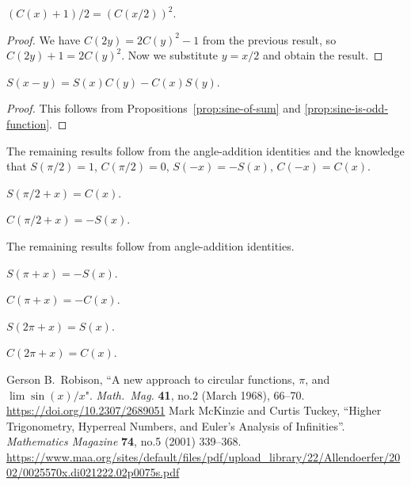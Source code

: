 \begin{proposition}
$(C(x) + 1)/2 = (C(x/2))^{2}$.
\end{proposition}

\begin{proof}
  We have $C(2y) = 2C(y)^{2} - 1$ from the previous result, so
  $C(2y) + 1 = 2C(y)^{2}$. Now we substitute $y=x/2$ and obtain the result.
\end{proof}

\begin{proposition}
$S(x-y) = S(x)C(y) - C(x)S(y)$.
\end{proposition}

\begin{proof}
This follows from Propositions~\ref{prop:sine-of-sum} and \ref{prop:sine-is-odd-function}.
\end{proof}

The remaining results follow from the angle-addition identities and the
knowledge that $S(\pi/2)=1$, $C(\pi/2)=0$, $S(-x)=-S(x)$, $C(-x)=C(x)$.

\begin{proposition}
$S(\pi/2 + x) = C(x)$.
\end{proposition}

\begin{proposition}
$C(\pi/2 + x) = -S(x)$.
\end{proposition}

The remaining results follow from angle-addition identities.

\begin{proposition}
$S(\pi + x) = - S(x)$.
\end{proposition}

\begin{proposition}
$C(\pi + x) = -C(x)$.
\end{proposition}

\begin{proposition}
$S(2\pi + x) = S(x)$.
\end{proposition}

\begin{proposition}
$C(2\pi + x) = C(x)$.
\end{proposition}

\begin{thebibliography}{9}
 Gerson B.~Robison,
  ``A new approach to circular functions, $\pi$, and $\lim\sin(x)/x$".
  \textit{Math.\ Mag.} \textbf{41}, no.2 (March 1968), 66--70.\newline
\url{https://doi.org/10.2307/2689051}
 Mark McKinzie and Curtis Tuckey,
  ``Higher Trigonometry, Hyperreal Numbers, and Euler's Analysis of Infinities''.
  \textit{Mathematics Magazine} \textbf{74}, no.5 (2001) 339--368.\newline
\url{https://www.maa.org/sites/default/files/pdf/upload_library/22/Allendoerfer/2002/0025570x.di021222.02p0075s.pdf}
\end{thebibliography}
